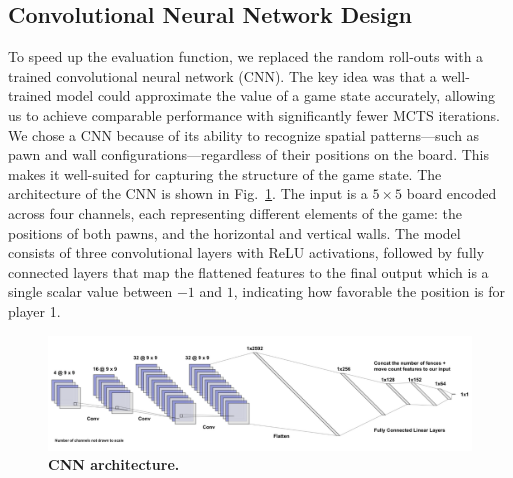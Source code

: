 \documentclass[10pt]{article}
\begin{document}
\subsection{Convolutional Neural Network Design}
To speed up the evaluation function, we replaced the random roll-outs with a trained convolutional neural network (CNN). The key idea was that a well-trained model could approximate the value of a game state accurately, allowing us to achieve comparable performance with significantly fewer MCTS iterations. We chose a CNN because of its ability to recognize spatial patterns—such as pawn and wall configurations—regardless of their positions on the board. This makes it well-suited for capturing the structure of the game state. The architecture of the CNN is shown in Fig.~\ref{fig:cnn_arch}. The input is a $5 \times 5$ board encoded across four channels, each representing different elements of the game: the positions of both pawns, and the horizontal and vertical walls. The model consists of three convolutional layers with ReLU activations, followed by fully connected layers that map the flattened features to the final output which is a single scalar value between $-1$ and $1$, indicating how favorable the position is for player 1. 
\begin{figure}[H]
    \centering
    \includegraphics[width=\linewidth]{cnn_arch.png}
    \caption{\textbf{CNN architecture.}}
    \label{fig:cnn_arch}
\end{figure}
\end{document}
